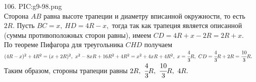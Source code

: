 106. {{PIC:g9-98.png}}\\
Сторона $AB$ равна высоте трапеции и диаметру вписанной окружности, то есть $2R.$ Пусть $BC=x,\ HD=4R-x,$ тогда так как трапеция является описанной (суммы противоположных сторон равны), имеем $CD=4R+x-2R=2R+x.$ По теореме Пифагора для треугольника $CHD$ получаем $(4R-x)^2+4R^2=(x+2R)^2,\
x^2-8xR+16R^2+4R^2=x^2+4xR+4R^2,\ x=\cfrac{4}{3}R,\ CD=\cfrac{4}{3}R+2R=\cfrac{10}{3}R.$ Таким образом,
стороны трапеции равны $2R,\ \cfrac{4}{3}R,\ \cfrac{10}{3}R,\ 4R.$\\
